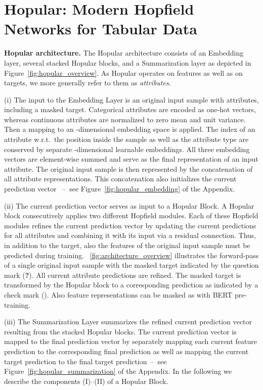 \documentclass{article}
\theoremstyle{plain}
\theoremstyle{definition}
\theoremstyle{remark}
\begin{document}
\section{Hopular: Modern Hopfield Networks for Tabular Data} \label{sec:mhn_tabular}

{\bf Hopular architecture.}
The Hopular architecture consists of an Embedding layer, several stacked 
Hopular blocks, and a Summarization layer as depicted in Figure~\ref{fig:hopular_overview}. As Hopular operates on features as well as on targets, we more generally refer to them as \emph{attributes}.

(i) The input to the Embedding Layer is an original input sample with  attributes, 
including a masked target.
Categorical attributes are encoded as one-hot vectors, 
whereas continuous attributes are normalized to zero mean 
and unit variance.
Then a mapping to an \mbox{-dimensional} embedding space is applied. 
The index of an attribute w.r.t.\ the position inside 
the sample as well as the attribute type are conserved 
by separate -dimensional learnable embeddings. 
All three embedding vectors are element-wise summed and
serve as the final representation of an input attribute. 
The original input sample is then represented by the concatenation of all
attribute representations. This concatenation also initializes the current 
prediction vector ~\---{}~see
Figure~\ref{fig:hopular_embedding} of the Appendix.

(ii) The current prediction vector serves as input to a Hopular Block.
A Hopular block consecutively applies two different Hopfield modules.
Each of these Hopfield modules refines the current prediction vector by updating
the current predictions for all attributes and combining it with its
input via a residual connection.
Thus, in addition to the target, also the features of the original input sample must be predicted during training.
\figurename~\ref{fig:architecture_overview} illustrates the forward-pass 
of a single original input sample with the masked target  
indicated by the question mark (\textbf{?}).
All current attribute predictions are refined.
The masked target is transformed by the Hopular block 
to a corresponding prediction as indicated by a check mark ().
Also feature representations can be masked as with
BERT pre-training.

(iii) The Summarization Layer summarizes the refined current prediction vector resulting from the stacked Hopular blocks.
The current prediction vector is mapped to the final prediction vector by separately mapping each current feature prediction to the corresponding final prediction as well as mapping the current target prediction to the final target prediction~\---{}~see Figure~\ref{fig:hopular_summarization} of the Appendix. In the following we describe the components (I)--(II) of a Hopular Block.
\end{document}
